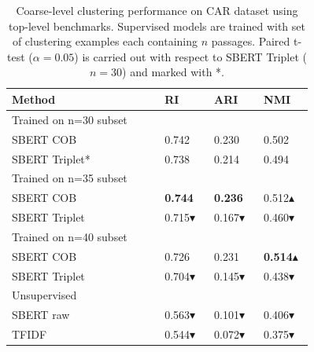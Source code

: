 \documentclass[11pt,a4paper]{article}
\begin{document}
\begin{table}[h]
\begin{small}
\caption{Coarse-level clustering performance on CAR dataset using top-level benchmarks. Supervised models are trained with set of clustering examples each containing $n$ passages. Paired t-test ($\alpha=0.05$) is carried out with respect to SBERT Triplet ($n=30$) and marked with *.}
\label{tab:trecexp}
\begin{tabular}{p{0.4\linewidth}p{0.12\linewidth}p{0.12\linewidth}p{0.12\linewidth}}
\hline
Method        & RI & ARI & NMI \\ \hline
Trained on n=30 subset&&\\
SBERT COB     & 0.742 & 0.230 & 0.502 \\
SBERT Triplet* & 0.738 & 0.214 & 0.494 \\ \hline
Trained on n=35 subset&&\\
SBERT COB     & \textbf{0.744} & \textbf{0.236} & 0.512$\blacktriangle$ \\
SBERT Triplet & 0.715$\blacktriangledown$ & 0.167$\blacktriangledown$ & 0.460$\blacktriangledown$ \\ \hline
Trained on n=40 subset&&\\
SBERT COB     & 0.726 & 0.231 & \textbf{0.514}$\blacktriangle$ \\
SBERT Triplet & 0.704$\blacktriangledown$ & 0.145$\blacktriangledown$ & 0.438$\blacktriangledown$ \\ \hline
Unsupervised&&\\
SBERT raw & 0.563$\blacktriangledown$ & 0.101$\blacktriangledown$ & 0.406$\blacktriangledown$ \\
TFIDF         & 0.544$\blacktriangledown$ & 0.072$\blacktriangledown$ & 0.375$\blacktriangledown$
\end{tabular}
\end{small}
\end{table}
\end{document}
